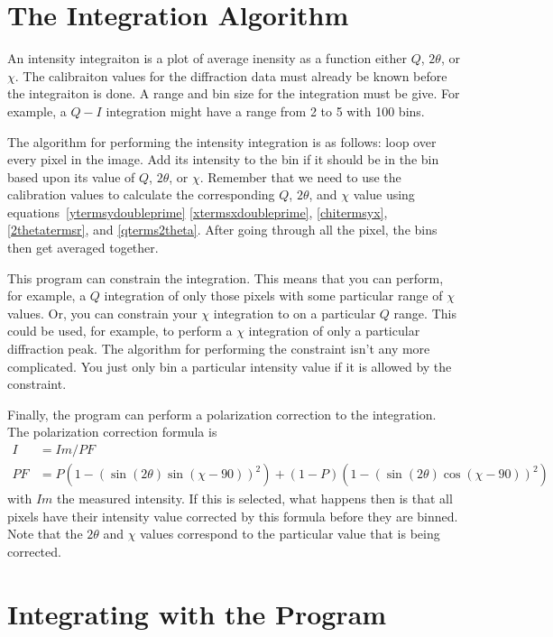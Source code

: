 \section{The Integration Algorithm}

An intensity integraiton is a plot of average inensity as 
a function either $Q$, $2\theta$, or $\chi$. The calibraiton 
values for the diffraction data must already be known before 
the integraiton is done. A range and bin size for the
integration must be give. For example, a $Q-I$ integration 
might have a range from 2 to 5 with 100 bins. 

The algorithm for performing the intensity integration
is as follows: loop over every pixel in the image. 
Add its intensity to the bin if it should be
in the bin based upon its value of $Q$, $2\theta$, or 
$\chi$. Remember that we need to use the calibration
values to calculate the corresponding $Q$, $2\theta$, and 
$\chi$ value using equations~\ref{ytermsydoubleprime}
\ref{xtermsxdoubleprime}, \ref{chitermsyx}, 
\ref{2thetatermsr}, and \ref{qterms2theta}.
After going through all the pixel, the bins then get averaged 
together. 

This program can constrain the integration. 
This means that you can perform, for example,
a $Q$ integration of only those pixels with some
particular range of $\chi$ values. Or, you can
constrain your $\chi$ integration to on a particular
$Q$ range. This could be used, for example, to
perform a $\chi$ integration of only a particular
diffraction peak. The algorithm for performing
the constraint isn't any more complicated. You just
only bin a particular intensity value if it is
allowed by the constraint.

Finally, the program can perform a polarization 
correction to the integration. The polarization 
correction formula is
\begin{align}
    I&=Im/PF \\ 
    PF&=P(1 - (\sin(2\theta)\sin(\chi-90))^2) + 
    (1 - P)(1 - (\sin(2\theta)\cos(\chi-90))^2)
\end{align}
with $Im$ the measured intensity. If this
is selected, what happens
then is that all pixels have their intensity
value corrected by this formula before they
are binned. Note that the $2\theta$ and $\chi$
values correspond to the particular value
that is being corrected.

\section{Integrating with the Program}


